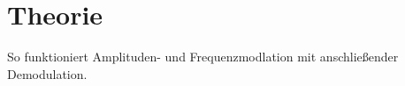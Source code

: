 \section{Theorie}

So funktioniert Amplituden- und Frequenzmodlation mit anschließender Demodulation.
